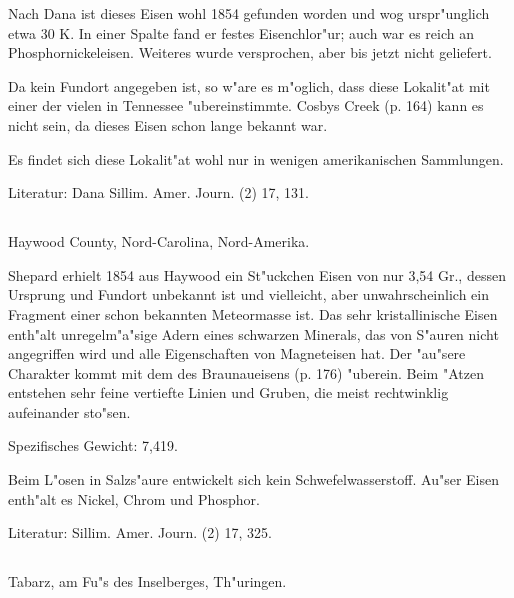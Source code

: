 \documentclass[a4paper, 11pt, oneside]{article}
\begin{document}
Nach Dana ist dieses Eisen wohl 1854 gefunden worden und wog urspr"unglich etwa 30 K. In einer Spalte fand er festes Eisenchlor"ur; auch war es reich an Phosphornickeleisen. Weiteres wurde versprochen, aber bis jetzt nicht geliefert.

Da kein Fundort angegeben ist, so w"are es m"oglich, dass diese Lokalit"at mit einer der vielen in Tennessee "ubereinstimmte. Cosbys Creek (p. 164) kann es nicht sein, da dieses Eisen schon lange bekannt war.

Es findet sich diese Lokalit"at wohl nur in wenigen amerikanischen Sammlungen.

\normalsize
Literatur: Dana Sillim. Amer. Journ. (2) 17, 131.

\subsection{}
\LARGE
\paragraph{}
Haywood County, Nord-Carolina, Nord-Amerika.

Shepard erhielt 1854 aus Haywood ein St"uckchen Eisen von nur 3,54 Gr., dessen Ursprung und Fundort unbekannt ist und vielleicht, aber unwahrscheinlich ein Fragment einer schon bekannten Meteormasse ist. Das sehr kristallinische Eisen enth"alt unregelm"a"sige Adern eines schwarzen Minerals, das von S"auren nicht angegriffen wird und alle Eigenschaften von Magneteisen hat. Der "au"sere Charakter kommt mit dem des Braunaueisens (p. 176) "uberein. Beim "Atzen entstehen sehr feine vertiefte Linien und Gruben, die meist rechtwinklig aufeinander sto"sen.

Spezifisches Gewicht: 7,419.

Beim L"osen in Salzs"aure entwickelt sich kein Schwefelwasserstoff. Au"ser Eisen enth"alt es Nickel, Chrom und Phosphor.

\normalsize
Literatur: Sillim. Amer. Journ. (2) 17, 325.

\subsection{}
\LARGE
\paragraph{}
Tabarz, am Fu"s des Inselberges, Th"uringen.
\end{document}
